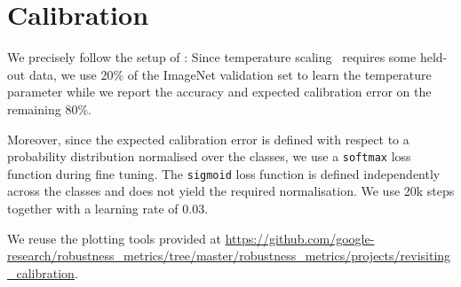 \section{Calibration}\label{app:calibration}

We precisely follow the setup of \citet{minderer2021revisiting}: Since temperature scaling~\citep{guo2017calibration} requires some held-out data, we use 20\% of the ImageNet validation set to learn the temperature parameter while we report the accuracy and expected calibration error on the remaining 80\%.

Moreover, since the expected calibration error is defined with respect to a probability distribution normalised over the classes, we use a \texttt{softmax} loss function during fine tuning. The \texttt{sigmoid} loss function is defined independently across the classes and does not yield the required normalisation. We use 20k steps together with a learning rate of 0.03. 

We reuse the plotting tools provided at \url{https://github.com/google-research/robustness_metrics/tree/master/robustness_metrics/projects/revisiting_calibration}.